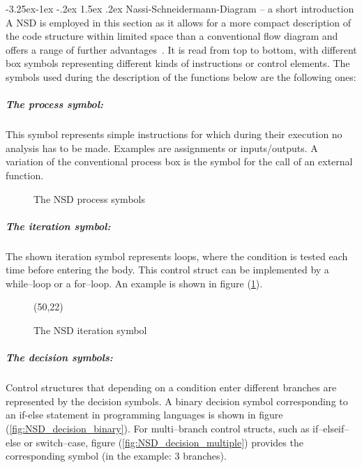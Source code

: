 \documentclass[11pt,a4paper,twoside]{report}
\makeatletter
\renewcommand\paragraph{\@startsection{paragraph}{4}{\z@}%
  {-3.25ex\@plus -1ex \@minus -.2ex}%
  {1.5ex \@plus .2ex}%
  {\normalfont\normalsize\bfseries}}
\makeatother
\begin{document}
\paragraph{Nassi-Schneidermann-Diagram -- a short introduction}
A NSD is employed in this section as it allows for a more compact description of the code structure within limited space than a conventional flow diagram and offers a range of further advantages~\cite{Nassi1973}. It is read from top to bottom, with different box symbols representing different kinds of instructions or control elements. The symbols used during the description of the functions below are the following ones:

\subparagraph{The process symbol:}

This symbol represents simple instructions for which during their execution no analysis has to be made. Examples are assignments or inputs/outputs. 
A variation of the conventional process box is the symbol for the call of an external function.
\begin{figure}
\centering
{}
\caption{The NSD process symbols }
\end{figure}

\subparagraph{The iteration symbol:}
The shown iteration symbol represents loops, where the condition is tested each time before entering the body. This control struct can be implemented by a while--loop or a for--loop. An example is shown in figure (\ref{NSD_whileLoop}).

\begin{figure}[H]
\centering
\label{NSD_whileLoop}
\begin{struktogramm}(50,22)
\whileend
\end{struktogramm}

\caption{The NSD iteration symbol}
\end{figure}

\subparagraph{The decision symbols:}
Control structures that depending on a condition enter different branches are represented by the decision symbols. A binary decision symbol corresponding to an if-else statement in programming languages is shown in figure (\ref{fig:NSD_decision_binary}). For multi--branch control structs, such as if--elseif--else or switch--case, figure (\ref{fig:NSD_decision_multiple}) provides the corresponding symbol (in the example: 3 branches).
 
\end{document}
